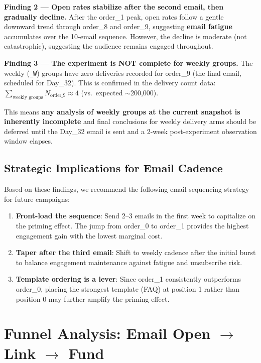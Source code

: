 \documentclass[12pt,a4paper]{article}
\begin{document}
\textbf{Finding 2 — Open rates stabilize after the second email, then gradually decline.}
After the order\_1 peak, open rates follow a gentle downward trend through order\_8
and order\_9, suggesting \textbf{email fatigue} accumulates over the 10-email sequence.
However, the decline is moderate (not catastrophic), suggesting the audience remains
engaged throughout.

\textbf{Finding 3 — The experiment is NOT complete for weekly groups.}
The weekly (\texttt{\_W}) groups have zero deliveries recorded for order\_9 (the final
email, scheduled for Day\_32). This is confirmed in the delivery count data:
$\sum_{\text{weekly groups}} N_{\text{order\_9}} \approx 4$ (vs.\ expected $\sim$200,000).

This means \textbf{any analysis of weekly groups at the current snapshot is inherently
incomplete} and final conclusions for weekly delivery arms should be deferred until
the Day\_32 email is sent and a 2-week post-experiment observation window elapses.

\subsection{Strategic Implications for Email Cadence}

Based on these findings, we recommend the following email sequencing strategy for
future campaigns:

\begin{enumerate}[leftmargin=2em]
  \item \textbf{Front-load the sequence}: Send 2--3 emails in the first week to
    capitalize on the priming effect. The jump from order\_0 to order\_1 provides
    the highest engagement gain with the lowest marginal cost.
  \item \textbf{Taper after the third email}: Shift to weekly cadence after the
    initial burst to balance engagement maintenance against fatigue and unsubscribe risk.
  \item \textbf{Template ordering is a lever}: Since order\_1 consistently
    outperforms order\_0, placing the strongest template (FAQ) at position 1 rather
    than position 0 may further amplify the priming effect.
\end{enumerate}

\clearpage
\section{Funnel Analysis: Email Open \texorpdfstring{$\to$}{→} Link \texorpdfstring{$\to$}{→} Fund}
\end{document}
